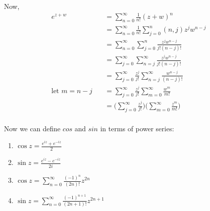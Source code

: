 \documentclass[a4paper, 11pt]{article}
\begin{document}
\noindent Now, 
	\begin{align*}
		e^{z+w} &= \sum_{n=0}^\infty \frac{1}{n!}(z+w)^n \\
			&= \sum_{n=0}^\infty \frac{1}{n!}\sum_{j=0}^n (n,j)z^jw^{n-j} \\
			&= \sum_{n=0}^\infty\sum_{j=0}^n \frac{z^jw^{n-j}}{j!(n-j)!} \\
			&= \sum_{j=0}^\infty \sum_{n=j}^{\infty} \frac{z^jw^{n-j}}{j!(n-j)!} \\ 
			&= \sum_{j=0}^\infty \frac{z^j}{j!} \sum_{n=j}^{\infty} \frac{w^{n-j}}{(n-j)!} \\
		 \text{let } m=n-j \quad &= \sum_{j=0}^\infty \frac{z^j}{j!}\sum_{m=0}^\infty \frac{w^m}{m!} \\ 
		 	&= \Bigg(\sum_{j=0}^\infty \frac{z^j}{j!}\Bigg)\Bigg(\sum_{m=0}^\infty \frac{z^m}{m!}\Bigg) \\ 
	\end{align*}

Now we can define $cos$ and $sin$ in terms of power series:
	\begin{center}
	\centering
	\begin{enumerate}
		\item $\cos z = \frac{e^{iz}+e^{-iz}}{2}$ 
		\item $\sin z = \frac{e^{iz}-e^{-iz}}{2i}$
		\item $\cos z = \sum_{n=0}^\infty \frac{(-1)^n}{(2n)!}z^{2n}$
		\item $\sin z = \sum_{n=0}^\infty \frac{(-1)^{n+1}}{(2n+1)!}z^{2n+1}$
	\end{enumerate}
	\end{center}
\end{document}
